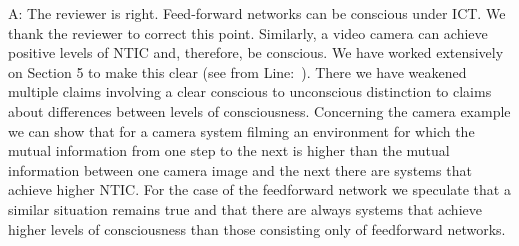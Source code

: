 \documentclass[utf8]{article}
\newenvironment{ans}  
    {\color{Black}\noindent A:}
    {~\newline}
\begin{document}
        \begin{ans}
        	The reviewer is right. Feed-forward networks can be conscious under ICT. We thank the reviewer to correct this point. Similarly, a video camera can achieve positive levels of NTIC and, therefore, be conscious. We have worked extensively on Section 5 to make this clear (see from Line:~).
        	There we have weakened multiple claims involving a clear conscious to unconscious distinction to claims about differences between levels of consciousness. 
        	Concerning the camera example we can show that for a camera system filming an environment for which the mutual information from one step to the next is higher than the mutual information between one camera image and the next there are systems that achieve higher NTIC. 
        	For the case of the feedforward network we speculate that a similar situation remains true and that there are always systems that achieve higher levels of consciousness than those consisting only of feedforward networks.
        	
        	
        	
		    
		    

	    


\end{ans}
\end{document}

